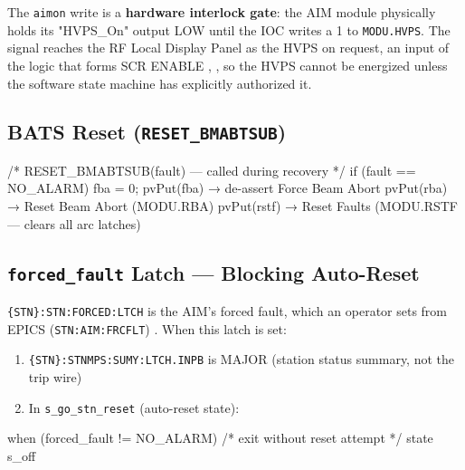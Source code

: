 The \texttt{aimon} write is a \textbf{hardware interlock gate}: the AIM module physically holds its "HVPS\_On" output LOW until the IOC writes a 1 to \texttt{MODU.HVPS}. The signal reaches the RF Local Display Panel as the HVPS on request, an input of the logic that forms SCR ENABLE , , so the HVPS cannot be energized unless the software state machine has explicitly authorized it.

\subsection{\texorpdfstring{BATS Reset (\texttt{RESET\_\allowbreak{}BMABTSUB})}{BATS Reset (RESET\_BMABTSUB)}}\label{sec:snl-bats-reset}


\begin{codeblock}
/* RESET_BMABTSUB(fault) — called during recovery */
if (fault == NO_ALARM) {
    fba = 0;    pvPut(fba)    → de-assert Force Beam Abort
    pvPut(rba)                 → Reset Beam Abort (MODU.RBA)
    pvPut(rstf)                → Reset Faults (MODU.RSTF — clears all arc latches)
}
\end{codeblock}

\subsection{\texorpdfstring{\texttt{forced\_fault} Latch --- Blocking Auto-Reset}{forced\_fault Latch --- Blocking Auto-Reset}}\label{sec:snl-forced-fault}


\texttt{\{STN\}:\allowbreak{}STN:\allowbreak{}FORCED:\allowbreak{}LTCH} is the AIM's forced fault, which an operator sets from EPICS (\texttt{STN:\allowbreak{}AIM:\allowbreak{}FRCFLT}) . When this latch is set:

\begin{enumerate}
\def\labelenumi{\arabic{enumi}.}
\tightlist
\item
  \texttt{\{STN\}:\allowbreak{}STNMPS:\allowbreak{}SUMY:\allowbreak{}LTCH.\allowbreak{}INPB} is MAJOR (station status summary, not the trip wire)
\item
  In \texttt{s\_\allowbreak{}go\_\allowbreak{}stn\_\allowbreak{}reset} (auto-reset state):
\end{enumerate}

\begin{codeblock}
   when (forced_fault != NO_ALARM) {
       /* exit without reset attempt */
   } state s_off
\end{codeblock}


